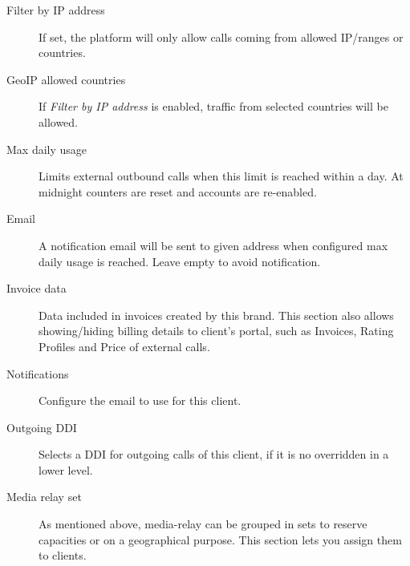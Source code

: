 \documentclass[letterpaper,10pt,english]{sphinxmanual}
\begin{document}
\begin{description}
\item[{Filter by IP address}] \leavevmode{}\label{administration_portal/brand/clients/virtual_pbx:term-filter-by-ip-address}
If set, the platform will only allow calls coming from allowed IP/ranges or countries.

\item[{GeoIP allowed countries}] \leavevmode{}\label{administration_portal/brand/clients/virtual_pbx:term-geoip-allowed-countries}
If \emph{Filter by IP address} is enabled, traffic from selected countries will be allowed.

\item[{Max daily usage}] \leavevmode{}\label{administration_portal/brand/clients/virtual_pbx:term-max-daily-usage}
Limits external outbound calls when this limit is reached within a day. At midnight counters are reset and
accounts are re-enabled.

\item[{Email}] \leavevmode{}\label{administration_portal/brand/clients/virtual_pbx:term-email}
A notification email will be sent to given address when configured max daily usage is reached. Leave empty to
avoid notification.

\item[{Invoice data}] \leavevmode{}\label{administration_portal/brand/clients/virtual_pbx:term-invoice-data}
Data included in invoices created by this brand. This section also allows showing/hiding billing details to
client's portal, such as Invoices, Rating Profiles and Price of external calls.

\item[{Notifications}] \leavevmode{}\label{administration_portal/brand/clients/virtual_pbx:term-notifications}
Configure the email {\hyperref[administration_portal/brand/settings/notification_templates:notification\string-templates]{}} to use for this client.

\item[{Outgoing DDI}] \leavevmode{}\label{administration_portal/brand/clients/virtual_pbx:term-outgoing-ddi}
Selects a DDI for outgoing calls of this client, if it is no overridden in
a lower level.

\item[{Media relay set}] \leavevmode{}\label{administration_portal/brand/clients/virtual_pbx:term-media-relay-set}
As mentioned above, media-relay can be grouped in sets to reserve capacities
or on a geographical purpose. This section lets you assign them to clients.


\end{description}
\end{document}
